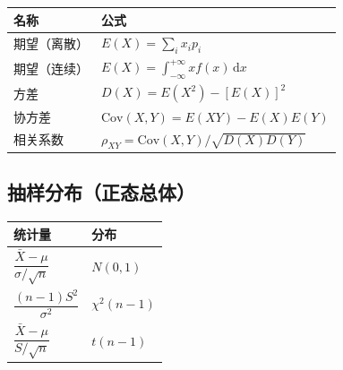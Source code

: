 \documentclass[12pt, a4paper]{article}
\newcommand{\Cov}{\mathrm{Cov}}
\newcommand{\dif}{\,\mathrm{d}}
\begin{document}
\begin{center}
    \renewcommand{\arraystretch}{1.6}
    \begin{tabular}{ll}
        \toprule
        名称     & 公式                                          \\
        \midrule
        期望（离散） & $E(X)=\sum_i x_i p_i$                       \\
        期望（连续） & $E(X)=\int_{-\infty}^{+\infty}x f(x)\dif x$ \\
        方差     & $D(X)=E(X^2)-[E(X)]^2$                      \\
        协方差    & $\Cov(X,Y)=E(XY)-E(X)E(Y)$                  \\
        相关系数   & $\rho_{XY}=\Cov(X,Y)/\!\sqrt{D(X)D(Y)}$     \\
        \bottomrule
    \end{tabular}
\end{center}

\subsection*{抽样分布（正态总体）}

\begin{center}
    \renewcommand{\arraystretch}{1.8}
    \begin{tabular}{ll}
        \toprule
        统计量                                    & 分布            \\
        \midrule
        $\dfrac{\bar{X}-\mu}{\sigma/\sqrt{n}}$ & $N(0,1)$      \\[6pt]
        $\dfrac{(n-1)S^2}{\sigma^2}$           & $\chi^2(n-1)$ \\[6pt]
        $\dfrac{\bar{X}-\mu}{S/\sqrt{n}}$      & $t(n-1)$      \\
        \bottomrule
    \end{tabular}
\end{center}
\end{document}
